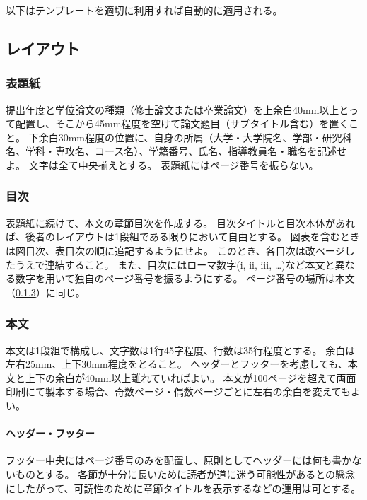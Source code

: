 		以下はテンプレートを適切に利用すれば自動的に適用される。

		\subsection{レイアウト}
			\label{sub:layout}

			\subsubsection{表題紙}
				\label{subs:titlepage}

				提出年度と学位論文の種類（修士論文または卒業論文）を上余白40mm以上とって配置し、そこから45mm程度を空けて論文題目（サブタイトル含む）を置くこと。
				下余白30mm程度の位置に、自身の所属（大学・大学院名、学部・研究科名、学科・専攻名、コース名）、学籍番号、氏名、指導教員名・職名を記述せよ。
				文字は全て中央揃えとする。
				表題紙にはページ番号を振らない。

			\subsubsection{目次}
				\label{subs:tableof}

				表題紙に続けて、本文の章節目次を作成する。
				目次タイトルと目次本体があれば、後者のレイアウトは1段組である限りにおいて自由とする。
				図表を含むときは図目次、表目次の順に追記するようにせよ。
				このとき、各目次は改ページしたうえで連結すること。
				また、目次にはローマ数字(i, ii, iii, \dots)など本文と異なる数字を用いて独自のページ番号を振るようにする。
				ページ番号の場所は本文（\cref{subs:body}）に同じ。

			\subsubsection{本文}
				\label{subs:body}

				本文は1段組で構成し、文字数は1行45字程度、行数は35行程度とする。
				余白は左右25mm、上下30mm程度をとること。
				ヘッダーとフッターを考慮しても、本文と上下の余白が40mm以上離れていればよい。
				本文が100ページを超えて両面印刷にて製本する場合、奇数ページ・偶数ページごとに左右の余白を変えてもよい。

				\paragraph{ヘッダー・フッター}
					\label{subs:header_footer}

					フッター中央にはページ番号のみを配置し、原則としてヘッダーには何も書かないものとする。
					各節が十分に長いために読者が道に迷う可能性があるとの懸念にしたがって、可読性のために章節タイトルを表示するなどの運用は可とする。


